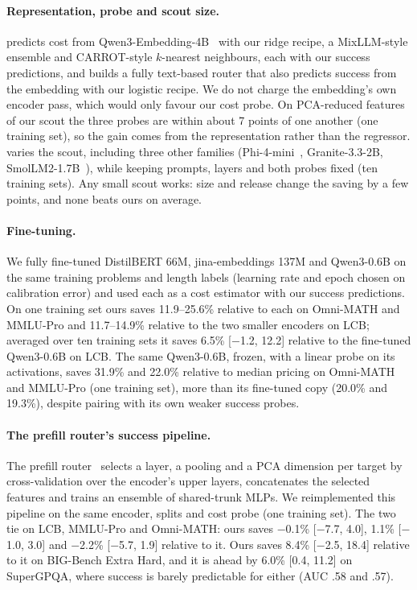 \documentclass[10pt]{article}
\begin{document}
\paragraph{Representation, probe and scout size.}
 predicts cost from Qwen3-Embedding-4B~\citep{qwen3emb} with our ridge recipe, a MixLLM-style ensemble and CARROT-style $k$-nearest neighbours, each with our success predictions, and builds a fully text-based router that also predicts success from the embedding with our logistic recipe. We do not charge the embedding's own encoder pass, which would only favour our cost probe. On PCA-reduced features of our scout the three probes are within about 7 points of one another (one training set), so the gain comes from the representation rather than the regressor.  varies the scout, including three other families (Phi-4-mini~\citep{phi4mini}, Granite-3.3-2B, SmolLM2-1.7B~\citep{smollm2}), while keeping prompts, layers and both probes fixed (ten training sets). Any small scout works: size and release change the saving by a few points, and none beats ours on average.

\paragraph{Fine-tuning.}
We fully fine-tuned DistilBERT 66M, jina-embeddings 137M and Qwen3-0.6B on the same training problems and length labels (learning rate and epoch chosen on calibration error) and used each as a cost estimator with our success predictions. On one training set ours saves 11.9--25.6\% relative to each on Omni-MATH and MMLU-Pro and 11.7--14.9\% relative to the two smaller encoders on LCB; averaged over ten training sets it saves 6.5\% [$-$1.2, 12.2] relative to the fine-tuned Qwen3-0.6B on LCB. The same Qwen3-0.6B, frozen, with a linear probe on its activations, saves 31.9\% and 22.0\% relative to median pricing on Omni-MATH and MMLU-Pro (one training set), more than its fine-tuned copy (20.0\% and 19.3\%), despite pairing with its own weaker success probes.

\paragraph{The prefill router's success pipeline.}
The prefill router~\citep{prefill} selects a layer, a pooling and a PCA dimension per target by cross-validation over the encoder's upper layers, concatenates the selected features and trains an ensemble of shared-trunk MLPs. We reimplemented this pipeline on the same encoder, splits and cost probe (one training set). The two tie on LCB, MMLU-Pro and Omni-MATH: ours saves $-$0.1\% [$-$7.7, 4.0], 1.1\% [$-$1.0, 3.0] and $-$2.2\% [$-$5.7, 1.9] relative to it. Ours saves 8.4\% [$-$2.5, 18.4] relative to it on BIG-Bench Extra Hard, and it is ahead by 6.0\% [0.4, 11.2] on SuperGPQA, where success is barely predictable for either (AUC .58 and .57).
\end{document}
